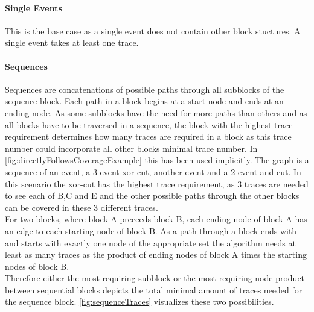 \documentclass[
	a4paper,
	pagesize,
	pdftex,
	12pt,
	twoside, %
	BCOR=5mm, %
	ngerman,
	fleqn,
	final,
	]{scrartcl}
\begin{document}
\paragraph{Single Events}
This is the base case as a single event does not contain other block stuctures. A single event takes at least one trace.\\
\paragraph{Sequences}
Sequences are concatenations of possible paths through all subblocks of the sequence block. Each path in a block begins at a start node and ends at an ending node. As some subblocks have the need for more paths than others and as all blocks have to be traversed in a sequence, the block with the highest trace requirement determines how many traces are required in a block as this trace number could incorporate all other blocks minimal trace number. In \ref{fig:directlyFollowsCoverageExample} this has been used implicitly. The graph is a sequence of an event, a 3-event xor-cut, another event and a 2-event and-cut. In this scenario the xor-cut has the highest trace requirement, as 3 traces are needed to see each of B,C and E and the other possible paths through the other blocks can be covered in these 3 different traces.\\
For two blocks, where block A preceeds block B, each ending node of block A has an edge to each starting node of block B. As a path through a block ends with and starts with exactly one node of the appropriate set the algorithm needs at least as many traces as the product of ending nodes of block A times the starting nodes of block B.\\ Therefore either the most requiring subblock or the most requiring node product between sequential blocks depicts the total minimal amount of traces needed for the sequence block. \ref{fig:sequenceTraces} visualizes these two possibilities.\\
\end{document}
